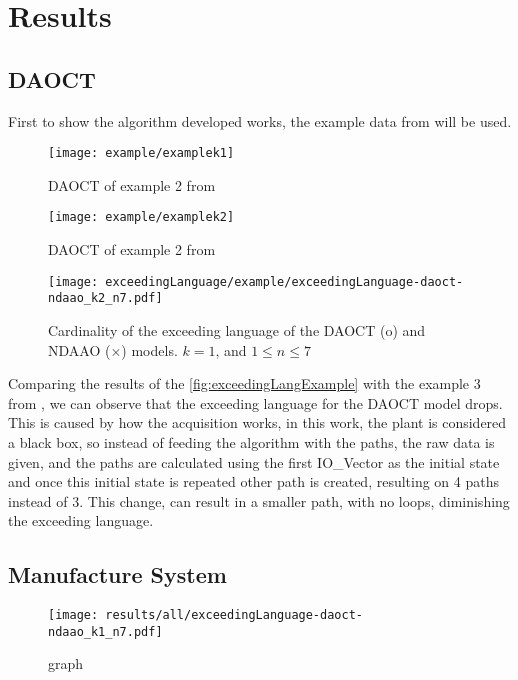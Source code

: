 \chapter{Results}

\section{DAOCT}
\label{sec:results_daoct}

First to show the algorithm developed works, the example data from
\cite{moreira2018enhanced} will be used.
\begin{figure}[H]
  \centering
  \texttt{[image: example/examplek1]}
  \caption{DAOCT of example 2 from }
  \label{fig:exceedingLangExample}
\end{figure}

\begin{figure}[H]
  \centering
  \texttt{[image: example/examplek2]}
  \caption{DAOCT of example 2 from }
  \label{fig:exceedingLangExample}
\end{figure}

\begin{figure}[H]
  \centering
  \texttt{[image: exceedingLanguage/example/exceedingLanguage-daoct-ndaao\_k2\_n7.pdf]}
  \caption{Cardinality of the exceeding language of the DAOCT (o) and NDAAO
    ($\times$) models. $k = 1$, and $1 \leq n \leq 7$}
  \label{fig:exceedingLangExample}
\end{figure}


Comparing the results of the \autoref{fig:exceedingLangExample}  with the
example 3 from \cite{moreira2018enhanced}, we can
observe that the exceeding language for the DAOCT model drops. This is caused by
how the acquisition works, in this work, the plant is considered a black box, so
instead of feeding the algorithm with the
paths, the raw data is given, and the paths are calculated using the first
IO\_Vector as the initial state and once this initial state is repeated other
path 
is created, resulting on 4 paths instead of 3. This change, can result in a
smaller path, with no loops, diminishing the exceeding language.


\section{Manufacture System}
\label{sec:results_system}

\begin{figure}[H]
  \centering
  \texttt{[image: results/all/exceedingLanguage-daoct-ndaao\_k1\_n7.pdf]}
  \caption{graph}
\end{figure}


